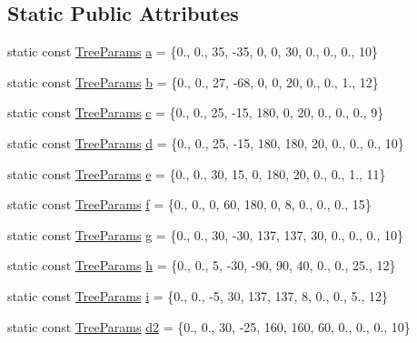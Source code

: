 \subsection*{Static Public Attributes}
\begin{DoxyCompactItemize}
\item 
static const \hyperlink{struct_para_tree_1_1_tree_params}{Tree\+Params} \hyperlink{struct_para_tree_1_1_presets_a91e10b4738fdd380fc676b38288cb81b}{a} = \{0., 0., 35, -\/35, 0, 0, 30, 0., 0., 0., 10\}
\item 
static const \hyperlink{struct_para_tree_1_1_tree_params}{Tree\+Params} \hyperlink{struct_para_tree_1_1_presets_a312f3c102ffcc4fcc6df99c28fc084d9}{b} = \{0., 0., 27, -\/68, 0, 0, 20, 0., 0., 1., 12\}
\item 
static const \hyperlink{struct_para_tree_1_1_tree_params}{Tree\+Params} \hyperlink{struct_para_tree_1_1_presets_a8ac6e067f498f41f6ce8d01f3c728be3}{c} = \{0., 0., 25, -\/15, 180, 0, 20, 0., 0., 0., 9\}
\item 
static const \hyperlink{struct_para_tree_1_1_tree_params}{Tree\+Params} \hyperlink{struct_para_tree_1_1_presets_af127f77665a64211dc6998fe4cb2c76f}{d} = \{0., 0., 25, -\/15, 180, 180, 20, 0., 0., 0., 10\}
\item 
static const \hyperlink{struct_para_tree_1_1_tree_params}{Tree\+Params} \hyperlink{struct_para_tree_1_1_presets_a92fa09db8f19a429c9c7ea1b67a77504}{e} = \{0., 0., 30, 15, 0, 180, 20, 0., 0., 1., 11\}
\item 
static const \hyperlink{struct_para_tree_1_1_tree_params}{Tree\+Params} \hyperlink{struct_para_tree_1_1_presets_a0be1972a4f38b31bba5c63fe93fbe0d5}{f} = \{0., 0., 0, 60, 180, 0, 8, 0., 0., 0., 15\}
\item 
static const \hyperlink{struct_para_tree_1_1_tree_params}{Tree\+Params} \hyperlink{struct_para_tree_1_1_presets_aef2261d8e5803e36fdaf1f3c89e02940}{g} = \{0., 0., 30, -\/30, 137, 137, 30, 0., 0., 0., 10\}
\item 
static const \hyperlink{struct_para_tree_1_1_tree_params}{Tree\+Params} \hyperlink{struct_para_tree_1_1_presets_a140de0ee6d4a2eca71f2757e410e1aa0}{h} = \{0., 0., 5, -\/30, -\/90, 90, 40, 0., 0., 25., 12\}
\item 
static const \hyperlink{struct_para_tree_1_1_tree_params}{Tree\+Params} \hyperlink{struct_para_tree_1_1_presets_ab93eec0b9e208968f9302197f1bbeb07}{i} = \{0., 0., -\/5, 30, 137, 137, 8, 0., 0., 5., 12\}
\item 
static const \hyperlink{struct_para_tree_1_1_tree_params}{Tree\+Params} \hyperlink{struct_para_tree_1_1_presets_ad76e40f8156ae12cbed4c46e368b0da9}{d2} = \{0., 0., 30, -\/25, 160, 160, 60, 0., 0., 0., 10\}
\end{DoxyCompactItemize}


